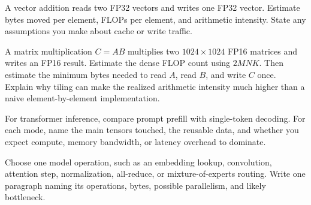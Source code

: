 \begin{exercises}
\item A vector addition reads two FP32 vectors and writes one FP32 vector. Estimate bytes moved per element, FLOPs per element, and arithmetic intensity. State any assumptions you make about cache or write traffic.
\item A matrix multiplication \(C = AB\) multiplies two \(1024 \times 1024\) FP16 matrices and writes an FP16 result. Estimate the dense FLOP count using \(2MNK\). Then estimate the minimum bytes needed to read \(A\), read \(B\), and write \(C\) once. Explain why tiling can make the realized arithmetic intensity much higher than a naive element-by-element implementation.
\item For transformer inference, compare prompt prefill with single-token decoding. For each mode, name the main tensors touched, the reusable data, and whether you expect compute, memory bandwidth, or latency overhead to dominate.
\item Choose one model operation, such as an embedding lookup, convolution, attention step, normalization, all-reduce, or mixture-of-experts routing. Write one paragraph naming its operations, bytes, possible parallelism, and likely bottleneck.
\end{exercises}
